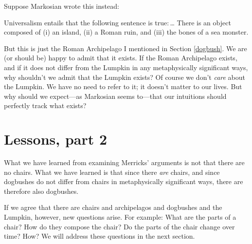 \documentclass[11pt]{article}
\newenvironment{squote}{%
\begin{spacing}{1}
       	\begin{list}{}{%
\setlength{\labelwidth}{0pt}%
\rightmargin\leftmargin%
}
\item\relax
}{%
\end{list}%
\end{spacing}
}
\begin{document}
\begin{spacing}{1.25}
Suppose Markosian wrote this instead:

\begin{squote}
Universalism entails that the following sentence is true:\,\ldots
There is an object composed of (i) an island, (ii) a Roman ruin, and
(iii) the bones of a sea monster.
\end{squote}

But this is just the Roman Archipelago I mentioned in Section
\ref{dogbush}.  We are (or should be) happy to admit that it exists.
If the Roman Archipelago exists, and if it does not differ from the
Lumpkin in any metaphysically significant ways, why shouldn't we admit
that the Lumpkin exists?  Of course we don't {\em care} about the
Lumpkin.  We have no need to refer to it; it doesn't matter to our
lives.  But why should we expect---as Markosian seems to---that our
intuitions should perfectly track what exists?

\section{Lessons, part 2}
\label{lessons-m}
What we have learned from examining Merricks' arguments is not that
there are no chairs.  What we have learned is that since there {\em
  are} chairs, and since dogbushes do not differ from chairs in
metaphysically significant ways, there are therefore also dogbushes.

If we agree that there are chairs and archipelagos and dogbushes and
the Lumpkin, however, new questions arise. For example: What are the
parts of a chair?  How do they compose the chair?  Do the parts of the
chair change over time?  How?  We will address these questions in the
next section.  

\ifstandalone
\end{spacing}


\fi
\end{document}
